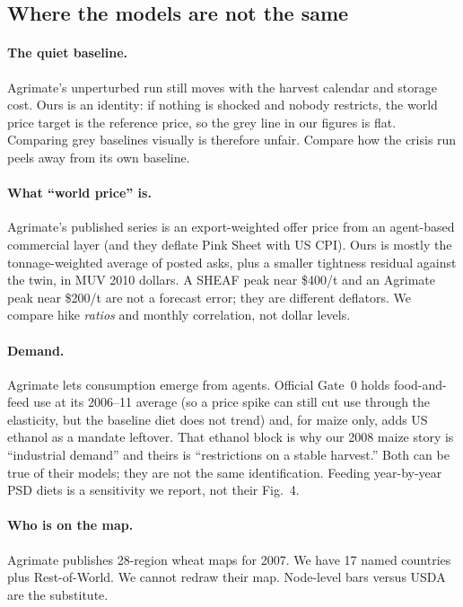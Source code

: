 \documentclass[11pt,a4paper]{article}
\begin{document}
\subsection{Where the models are not the same}

\paragraph{The quiet baseline.}
Agrimate's unperturbed run still moves with the harvest calendar and
storage cost. Ours is an identity: if nothing is shocked and nobody
restricts, the world price target is the reference price, so the grey
line in our figures is flat. Comparing grey baselines visually is
therefore unfair. Compare how the crisis run peels away from its own
baseline.

\paragraph{What ``world price'' is.}
Agrimate's published series is an export-weighted offer price from an
agent-based commercial layer (and they deflate Pink Sheet with US CPI).
Ours is mostly the tonnage-weighted average of posted asks, plus a
smaller tightness residual against the twin, in MUV 2010 dollars. A
SHEAF peak near \$400/t and an Agrimate peak near \$200/t are not a
forecast error; they are different deflators. We compare hike
\emph{ratios} and monthly correlation, not dollar levels.

\paragraph{Demand.}
Agrimate lets consumption emerge from agents. Official Gate~0 holds
food-and-feed use at its 2006--11 average (so a price spike can still
cut use through the elasticity, but the baseline diet does not trend)
and, for maize only, adds US ethanol as a mandate leftover. That ethanol
block is why our 2008 maize story is ``industrial demand'' and theirs is
``restrictions on a stable harvest.'' Both can be true of their models;
they are not the same identification. Feeding year-by-year PSD diets is
a sensitivity we report, not their Fig.~4.

\paragraph{Who is on the map.}
Agrimate publishes 28-region wheat maps for 2007. We have 17 named
countries plus Rest-of-World. We cannot redraw their map. Node-level
bars versus USDA are the substitute.
\end{document}
